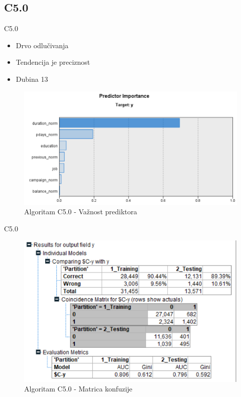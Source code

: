 \documentclass{beamer}
\begin{document}
\subsection{C5.0}
\begin{frame}{C5.0}

	 \begin{itemize}
        \item Drvo odlučivanja
        \item Tendencija je preciznost
        \item Dubina 13
    \end{itemize}
    \begin{figure}[h!]
                \begin{center}
                \includegraphics[scale=0.4]{c5_predictor.png}
                \end{center}
                \caption{Algoritam C5.0 - Važnost prediktora}
             \end{figure}
\end{frame}

\begin{frame}{C5.0}
    \begin{figure}[h!]
                \begin{center}
                \includegraphics[scale=0.60]{c5_matrix.png}
                \end{center}
                \caption{Algoritam C5.0 - Matrica konfuzije}
             \end{figure}
\end{frame}
\end{document}
